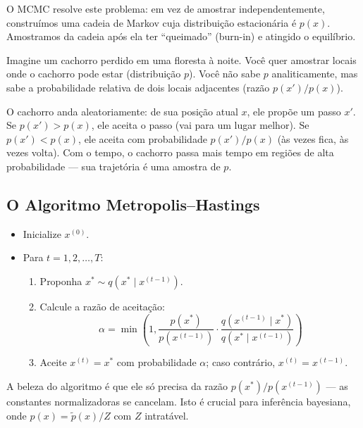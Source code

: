\documentclass{tufte-handout}
\begin{document}
O MCMC resolve este problema: em vez de amostrar independentemente, construímos uma
cadeia de Markov cuja distribuição estacionária é $p(x)$. Amostramos da cadeia após
ela ter ``queimado'' (burn-in) e atingido o equilíbrio.

\begin{exmp}
    Imagine um cachorro perdido em uma floresta à noite. Você quer amostrar locais
    onde o cachorro pode estar (distribuição $p$). Você não sabe $p$ analiticamente,
    mas sabe a probabilidade relativa de dois locais adjacentes (razão $p(x')/p(x)$).

    O cachorro anda aleatoriamente: de sua posição atual $x$, ele propõe um passo
    $x'$. Se $p(x') > p(x)$, ele aceita o passo (vai para um lugar melhor).
    Se $p(x') < p(x)$, ele aceita com probabilidade $p(x')/p(x)$ (às vezes fica,
    às vezes volta). Com o tempo, o cachorro passa mais tempo em regiões de alta
    probabilidade --- sua trajetória é uma amostra de $p$.
\end{exmp}

\subsection{O Algoritmo Metropolis--Hastings}

\begin{algorithm}[h]
\caption{Metropolis--Hastings}
\begin{itemize}
    \item Inicialize $x^{(0)}$.
    \item Para $t = 1, 2, \dots, T$:
    \begin{enumerate}
        \item Proponha $x^* \sim q(x^* \mid x^{(t-1)})$.
        \item Calcule a razão de aceitação:
        \[
        \alpha = \min\left(1, \frac{p(x^*)}{p(x^{(t-1)})} \cdot \frac{q(x^{(t-1)} \mid x^*)}{q(x^* \mid x^{(t-1)})} \right)
        \]
        \item Aceite $x^{(t)} = x^*$ com probabilidade $\alpha$; caso contrário,
        $x^{(t)} = x^{(t-1)}$.
    \end{enumerate}
\end{itemize}
\end{algorithm}

A beleza do algoritmo é que ele só precisa da razão $p(x^*)/p(x^{(t-1)})$ --- as constantes
normalizadoras se cancelam. Isto é crucial para inferência bayesiana, onde
$p(x) = \tilde{p}(x)/Z$ com $Z$ intratável.
\end{document}
